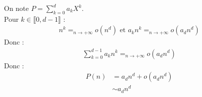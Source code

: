 \documentclass[../main.tex]{subfiles}
\begin{document}
\noindent On note $P = \sum\limits_{k=0}^d a_k X^k$. \\
Pour $k\in \llbracket 0, d-1 \rrbracket$ : 
\begin{align*}
    n^k =_{n\to +\infty} o(n^d) \text{ et } a_k n^k =_{n\to +\infty} o(a_d n^d)
\end{align*}
Donc :
\begin{align*}
    \sum_{k=0}^{d-1} a_k n^k =_{n\to +\infty} o(a_d n^d)
\end{align*}
Donc : 
\begin{align*}
    P(n) &= a_d n^d + o(a_d n^d) \\
    &\sim a_d n^d
\end{align*}
\end{document}
